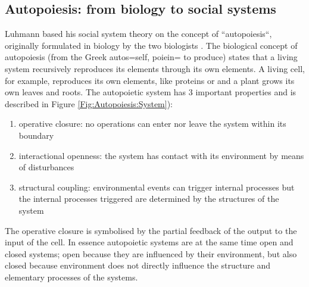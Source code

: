 \subsection{Autopoiesis: from biology to social systems}
Luhmann based his social system theory on the concept of ``autopoiesis``,
originally formulated in biology by the two biologists \citet{Maturana1980}.
The biological concept of autopoiesis (from the Greek autos=self, poiein= to produce)
states that a living system recursively reproduces its elements through its own elements.
A living cell, for example, reproduces its own elements, like proteins or
and a plant grows its own leaves and roots.
The autopoietic system has 3 important properties and is described in Figure \ref{Fig:Autopoiesis:System}):
\begin{enumerate}
 \item operative closure: no operations can enter nor leave the system within its boundary
 \item interactional openness: the system has contact with its environment by means of disturbances
 \item structural coupling: environmental events can trigger internal processes but the internal
processes triggered are determined by the structures of the system
\end{enumerate}
The operative closure is symbolised by the partial feedback of the output to the 
input of the cell.
In essence autopoietic systems are at the same time open and closed systems;
open because they are influenced by their environment,
but also closed because environment does not directly
influence the structure and elementary processes of the systems.

